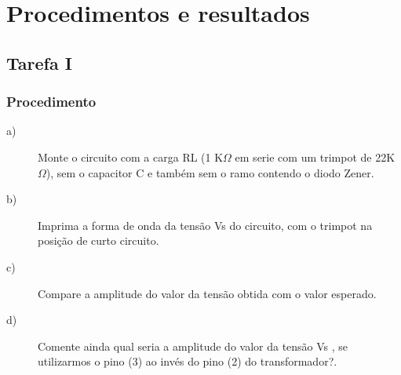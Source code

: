\setcounter{topnumber}{5}
\setcounter{bottomnumber}{5}
\setcounter{totalnumber}{5}

\nocite{Intro}
\nocite{Intro2}
\nocite{Intro3}
\nocite{Intro4}

\chapter{Procedimentos e resultados}

\section{Tarefa I}
\subsection{Procedimento}
\begin{description}
	\item[a)]Monte o circuito com a carga RL (1 K$\Omega$ em serie com um trimpot de 22K$\Omega$), sem o capacitor C e também sem o ramo contendo o diodo Zener.
	\item[b)] Imprima a forma de onda da tensão Vs do circuito, com o trimpot na posição de curto circuito.
	\item[c)] Compare a amplitude do valor da tensão obtida com o valor esperado.
	\item[d)] Comente ainda qual seria a amplitude do valor da tensão Vs , se utilizarmos o pino (3) ao invés do pino (2) do transformador?.
\end{description}
